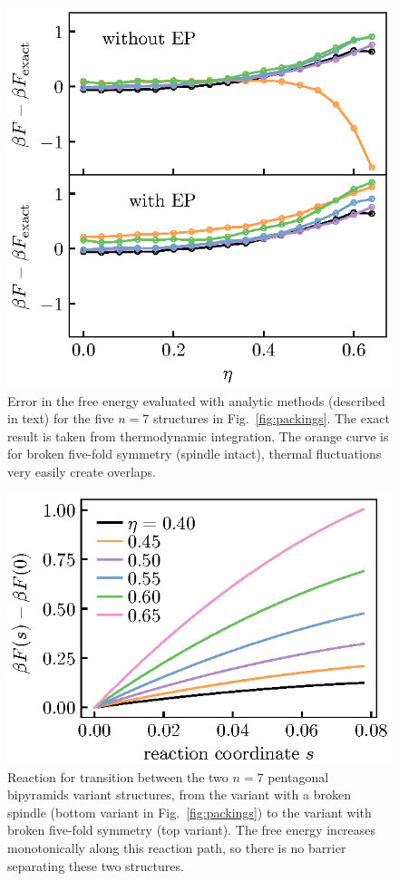 \documentclass[11pt,twoside]{report}
\begin{document}
\begin{figure}
  \includegraphics[width=0.9\linewidth,outer]{ep-n7}
  \caption[Errors in EP]{
    Error in the free energy evaluated with analytic methods (described in text) for the five $n = 7$ structures in Fig.\ \ref{fig:packings}.
    The exact result is taken from thermodynamic integration.
    The orange curve is for broken five-fold symmetry (spindle intact), thermal fluctuations very easily create overlaps.
  }
\end{figure}

\begin{figure}
  \includegraphics[width=0.9\linewidth,outer]{n7-reaction-path}
  \caption[Reaction path for the two variants of the frustrated pentagonal bipyramid]{
    Reaction for transition between the two $n = 7$ pentagonal bipyramids variant structures, from the variant with a broken spindle (bottom variant in Fig.\ \ref{fig:packings}) to the variant with broken five-fold symmetry (top variant).
    The free energy increases monotonically along this reaction path, so there is no barrier separating these two structures.
  }
  \label{fig:reaction-path-7}
\end{figure}
\end{document}
